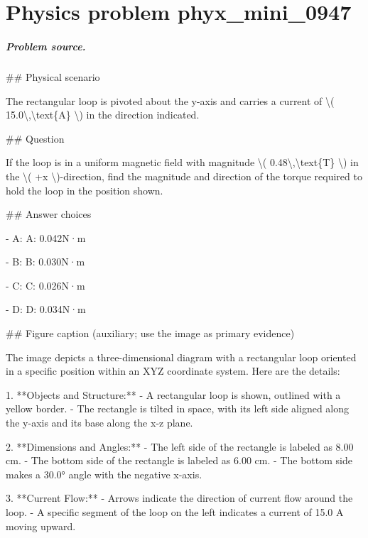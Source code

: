 
\chapter{Physics problem phyx\_mini\_0947}
\label{ch:PhyXMiniProblems_problem_phyx_mini_0947}

\paragraph{Problem source.}
\#\# Physical scenario

The rectangular loop is pivoted about the y-axis and carries a current of \textbackslash{}( 15.0\textbackslash{},\textbackslash{}text\{A\} \textbackslash{}) in the direction indicated.

\#\# Question

If the loop is in a uniform magnetic field with magnitude \textbackslash{}( 0.48\textbackslash{},\textbackslash{}text\{T\} \textbackslash{}) in the \textbackslash{}( +x \textbackslash{})-direction, find the magnitude and direction of the torque required to hold the loop in the position shown.

\#\# Answer choices

- A: A: 0.042N·m

- B: B: 0.030N·m

- C: C: 0.026N·m

- D: D: 0.034N·m

\#\# Figure caption (auxiliary; use the image as primary evidence)

The image depicts a three-dimensional diagram with a rectangular loop oriented in a specific position within an XYZ coordinate system. Here are the details:

1. **Objects and Structure:**
   - A rectangular loop is shown, outlined with a yellow border.
   - The rectangle is tilted in space, with its left side aligned along the y-axis and its base along the x-z plane.

2. **Dimensions and Angles:**
   - The left side of the rectangle is labeled as 8.00 cm.
   - The bottom side of the rectangle is labeled as 6.00 cm.
   - The bottom side makes a 30.0° angle with the negative x-axis.

3. **Current Flow:**
   - Arrows indicate the direction of current flow around the loop.
   - A specific segment of the loop on the left indicates a current of 15.0 A moving upward.

